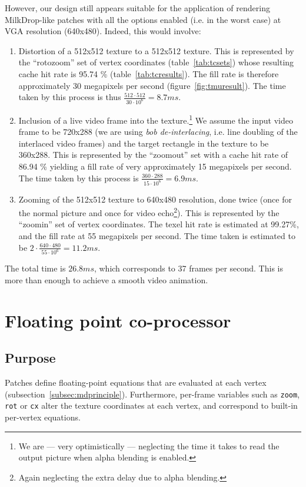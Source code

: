 \documentclass[a4paper,11pt]{kthesis}
\begin{document}
However, our design still appears suitable for the application of rendering MilkDrop-like patches with all the options enabled (i.e. in the worst case) at VGA resolution (640x480). Indeed, this would involve:
\begin{enumerate}
\item Distortion of a 512x512 texture to a 512x512 texture. This is represented by the ``rotozoom'' set of vertex coordinates (table~\ref{tab:tcsets}) whose resulting cache hit rate is 95.74 \% (table~\ref{tab:tcresults}). The fill rate is therefore approximately 30 megapixels per second (figure~\ref{fig:tmuresult}). The time taken by this process is thus $\frac{512 \cdot 512}{30 \cdot 10^{6}}=8.7\unit{ms}$.
\item Inclusion of a live video frame into the texture.\footnote{We are --- very optimistically --- neglecting the time it takes to read the output picture when alpha blending is enabled.} We assume the input video frame to be 720x288 (we are using \textit{bob de-interlacing}, i.e. line doubling of the interlaced video frames) and the target rectangle in the texture to be 360x288. This is represented by the ``zoomout'' set with a cache hit rate of 86.94 \% yielding a fill rate of very approximately 15 megapixels per second. The time taken by this process is $\frac{360 \cdot 288}{15 \cdot 10^{6}}=6.9\unit{ms}$.
\item Zooming of the 512x512 texture to 640x480 resolution, done twice (once for the normal picture and once for video echo\footnote{Again neglecting the extra delay due to alpha blending.}). This is represented by the ``zoomin'' set of vertex coordinates. The texel hit rate is estimated at 99.27\%, and the fill rate at 55 megapixels per second. The time taken is estimated to be $2 \cdot \frac{640 \cdot 480}{55 \cdot 10^{6}}=11.2\unit{ms}$.
\end{enumerate}

The total time is $26.8\unit{ms}$, which corresponds to 37 frames per second. This is more than enough to achieve a smooth video animation.

\chapter{Floating point co-processor}
\label{ch:pfpu}
\section{Purpose}
\label{sec:pfpupurpose}
Patches define floating-point equations that are evaluated at each vertex (subsection~\ref{subsec:mdprinciple}). Furthermore, per-frame variables such as \verb!zoom!, \verb!rot! or \verb!cx! alter the texture coordinates at each vertex, and correspond to built-in per-vertex equations.
\end{document}
